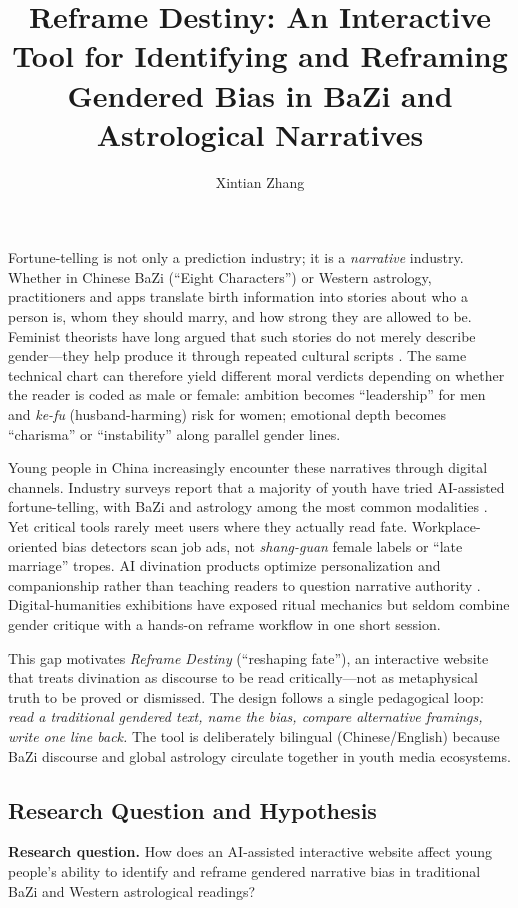 \documentclass[stu,12pt,floatsintext]{apa7}
\title{Reframe Destiny: An Interactive Tool for Identifying and Reframing Gendered Bias in BaZi and Astrological Narratives}
\author{Xintian Zhang}
\affiliation{Generation AI 2026 Research Project}
\begin{document}
\maketitle

Fortune-telling is not only a prediction industry; it is a \emph{narrative} industry. Whether in Chinese BaZi (``Eight Characters'') or Western astrology, practitioners and apps translate birth information into stories about who a person is, whom they should marry, and how strong they are allowed to be. Feminist theorists have long argued that such stories do not merely describe gender---they help produce it through repeated cultural scripts \parencite{butler1990}. The same technical chart can therefore yield different moral verdicts depending on whether the reader is coded as male or female: ambition becomes ``leadership'' for men and \emph{ke-fu} (husband-harming) risk for women; emotional depth becomes ``charisma'' or ``instability'' along parallel gender lines.

Young people in China increasingly encounter these narratives through digital channels. Industry surveys report that a majority of youth have tried AI-assisted fortune-telling, with BaZi and astrology among the most common modalities \parencite{houlang2025}. Yet critical tools rarely meet users where they actually read fate. Workplace-oriented bias detectors scan job ads, not \emph{shang-guan} female labels or ``late marriage'' tropes. AI divination products optimize personalization and companionship rather than teaching readers to question narrative authority \parencite{bender2021}. Digital-humanities exhibitions have exposed ritual mechanics but seldom combine gender critique with a hands-on reframe workflow in one short session.

This gap motivates \textit{Reframe Destiny} (``reshaping fate''), an interactive website that treats divination as discourse to be read critically---not as metaphysical truth to be proved or dismissed. The design follows a single pedagogical loop: \emph{read a traditional gendered text, name the bias, compare alternative framings, write one line back.} The tool is deliberately bilingual (Chinese/English) because BaZi discourse and global astrology circulate together in youth media ecosystems.

\subsection{Research Question and Hypothesis}

\textbf{Research question.} How does an AI-assisted interactive website affect young people's ability to identify and reframe gendered narrative bias in traditional BaZi and Western astrological readings?
\end{document}
